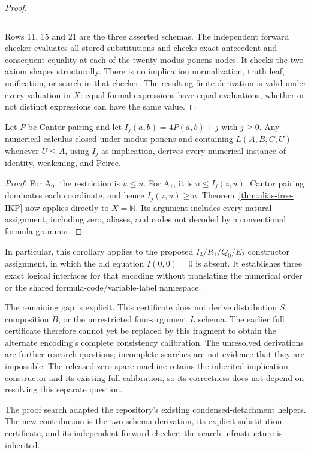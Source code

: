 \begin{proof}
\begin{center}
\begin{tabular}{rll}
\end{tabular}
\end{center}
Rows 11, 15 and 21 are the three asserted schemas.
The independent forward checker evaluates all stored substitutions and
checks exact antecedent and consequent equality at each of the twenty
modus-ponens nodes. It checks the two axiom shapes structurally.
There is no implication normalization, truth leaf, unification, or
search in that checker. The resulting finite derivation is valid under
every valuation in $X$: equal formal expressions have equal evaluations,
whether or not distinct expressions can have the same value.
\end{proof}

\begin{corollary}
\label{cor:alias-free-tags}
Let $P$ be Cantor pairing and let $I_j(a,b)=4P(a,b)+j$ with $j\geq0$.
Any numerical calculus closed under modus ponens and containing
$L(A,B,C,U)$ whenever $U\leq A$, using $I_j$ as implication, derives
every numerical instance of identity, weakening, and Peirce.
\end{corollary}

\begin{proof}
For $\mathrm A_0$, the restriction is $u\leq u$.
For $\mathrm A_1$, it is $u\leq I_j(z,u)$.
Cantor pairing dominates each coordinate, and hence
$I_j(z,u)\geq u$. Theorem~\ref{thm:alias-free-IKP} now applies directly
to $X=\mathbb N$. Its argument includes every natural assignment,
including zero, aliases, and codes not decoded by a conventional
formula grammar.
\end{proof}

In particular, this corollary applies to the proposed
$I_3/R_1/Q_0/E_2$ constructor assignment, in which the old equation
$I(0,0)=0$ is absent. It establishes three exact logical interfaces for
that encoding without translating the numerical order or the shared
formula-code/variable-label namespace.

The remaining gap is explicit. This certificate does not derive
distribution $S$, composition $B$, or the unrestricted four-argument
$L$ schema. The earlier full certificate therefore cannot yet be
replaced by this fragment to obtain the alternate encoding's complete
consistency calibration. The unresolved derivations are further
research questions; incomplete searches are not evidence that they
are impossible. The released zero-spare machine retains the inherited
implication constructor and its existing full calibration, so its
correctness does not depend on resolving this separate question.

The proof search adapted the repository's existing
condensed-detachment helpers. The new contribution is the two-schema
derivation, its explicit-substitution certificate, and its independent
forward checker; the search infrastructure is inherited.
